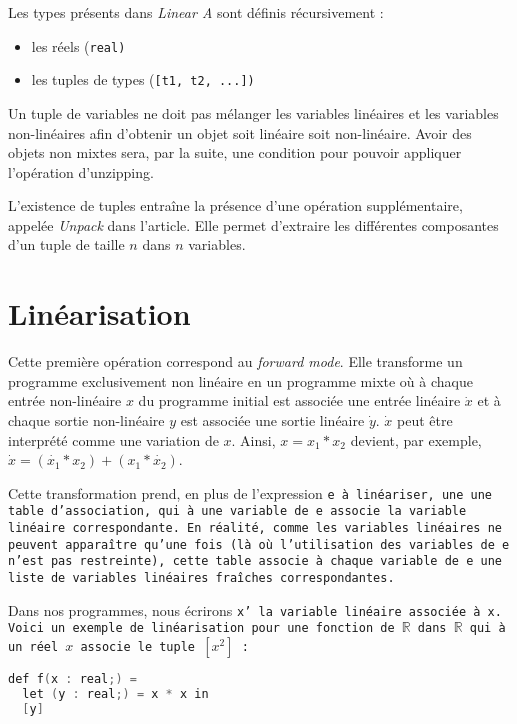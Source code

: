 \documentclass[a4paper, french, 11pt]{article}
\begin{document}
Les types présents dans \textit{Linear A} sont définis récursivement : 
\begin{itemize}
  \item les réels (\tt real\rm)
  \item les tuples de types (\tt [t1, t2, ...]\rm)
\end{itemize}

Un tuple de variables ne doit pas mélanger les variables linéaires et les variables non-linéaires afin d'obtenir un objet soit linéaire soit non-linéaire. Avoir des objets non mixtes sera, par la suite, une condition pour pouvoir appliquer l'opération d'unzipping.

L'existence de tuples entraîne la présence d'une opération supplémentaire, appelée \textit{Unpack} dans l'article. Elle permet d'extraire les différentes composantes d'un tuple de taille $n$ dans $n$ variables.




\section{Linéarisation}

Cette première opération correspond au \textit{forward mode}. Elle transforme un programme exclusivement non linéaire en un programme mixte où à chaque entrée non-linéaire $x$ du programme initial est associée une entrée linéaire $\dot x $ et à chaque sortie non-linéaire $y$ est associée une sortie linéaire $\dot y$. $\dot x$ peut être interprété comme une variation de $x$. Ainsi, $x = x_1 * x_2$ devient, par exemple, $\dot x = (\dot {x_1} * x_2) + (x_1 * \dot {x_2})$.

Cette transformation prend, en plus de l'expression \tt e \rm à linéariser, une une table d'association, qui à une variable de \tt e \rm associe la variable linéaire correspondante. En réalité, comme les variables linéaires ne peuvent apparaître qu'une fois (là où l'utilisation des variables de \tt e \rm n'est pas restreinte), cette table associe à chaque variable de \tt e \rm une liste de variables linéaires fraîches correspondantes.

Dans nos programmes, nous écrirons \tt x' \rm la variable linéaire associée à \tt x\rm. Voici un exemple de linéarisation pour une fonction de $\mathbb{R}$ dans $\mathbb{R}$ qui à un réel $x$ associe le tuple $[x^2]$ :

\begin{lstlisting}[style=myStyle, language=C]
def f(x : real;) =
  let (y : real;) = x * x in
  [y]
\end{lstlisting}  
\end{document}
